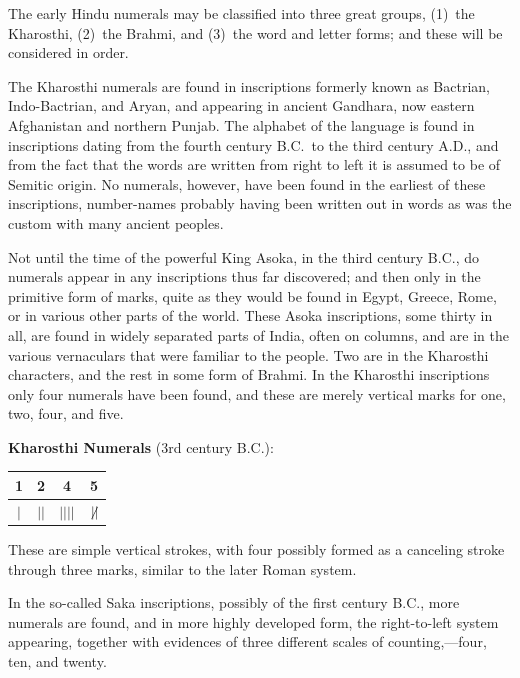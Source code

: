 \documentclass[11pt,a4paper]{article}
\newenvironment{enhancednote}{%
  \begin{tcolorbox}[colback=enhancedbg,colframe=notecolor,boxrule=1pt,
    left=10pt,right=10pt,top=8pt,bottom=8pt,
    title={\textbf{Enhanced Edition Note}},fonttitle=\bfseries\color{notecolor}]
}{\end{tcolorbox}}
\begin{document}
The early Hindu numerals may be classified into three great groups, (1)~the Kharosthi, (2)~the Brahmi, and (3)~the word and letter forms; and these will be considered in order.

The Kharosthi numerals are found in inscriptions formerly known as Bactrian, Indo-Bactrian, and Aryan, and appearing in ancient Gandhara, now eastern Afghanistan and northern Punjab. The alphabet of the language is found in inscriptions dating from the fourth century B.C.\ to the third century A.D., and from the fact that the words are written from right to left it is assumed to be of Semitic origin. No numerals, however, have been found in the earliest of these inscriptions, number-names probably having been written out in words as was the custom with many ancient peoples.

Not until the time of the powerful King Asoka, in the third century B.C., do numerals appear in any inscriptions thus far discovered; and then only in the primitive form of marks, quite as they would be found in Egypt, Greece, Rome, or in various other parts of the world. These Asoka inscriptions, some thirty in all, are found in widely separated parts of India, often on columns, and are in the various vernaculars that were familiar to the people. Two are in the Kharosthi characters, and the rest in some form of Brahmi. In the Kharosthi inscriptions only four numerals have been found, and these are merely vertical marks for one, two, four, and five.

\begin{enhancednote}
\textbf{Kharosthi Numerals} (3rd century B.C.):

\begin{center}
\begin{tabular}{|c|c|c|c|}
\hline
\textbf{1} & \textbf{2} & \textbf{4} & \textbf{5} \\
\hline
$|$ & $||$ & $|||\!|$ & $\not\!||$ \\
\hline
\end{tabular}
\end{center}

These are simple vertical strokes, with four possibly formed as a canceling stroke through three marks, similar to the later Roman system.
\end{enhancednote}

In the so-called Saka inscriptions, possibly of the first century B.C., more numerals are found, and in more highly developed form, the right-to-left system appearing, together with evidences of three different scales of counting,---four, ten, and twenty.
\end{document}
